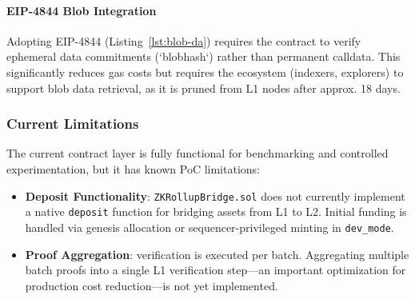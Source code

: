 \paragraph{EIP-4844 Blob Integration}
Adopting EIP-4844 (Listing~\ref{lst:blob-da}) requires the contract to verify ephemeral data commitments (`blobhash`) rather than permanent calldata. This significantly reduces gas costs but requires the ecosystem (indexers, explorers) to support blob data retrieval, as it is pruned from L1 nodes after approx. 18 days.

\subsubsection{Current Limitations}

The current contract layer is fully functional for benchmarking and controlled experimentation, but it has known PoC limitations:
\begin{itemize}
    \item \textbf{Deposit Functionality}: \texttt{ZKRollupBridge.sol} does not currently implement a native \texttt{deposit} function for bridging assets from L1 to L2. Initial funding is handled via genesis allocation or sequencer-privileged minting in \texttt{dev\_mode}.
    \item \textbf{Proof Aggregation}: verification is executed per batch. Aggregating multiple batch proofs into a single L1 verification step—an important optimization for production cost reduction—is not yet implemented.
\end{itemize}

